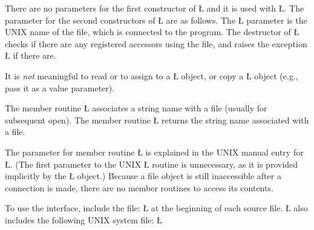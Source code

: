 \documentclass[openright,twoside]{report}
\begin{document}
There are no parameters for the first constructor of \LGinlinetrue\LGbegin\lgrinde\L{}\endlgrinde\LGend{} and it is used with \LGinlinetrue\LGbegin\lgrinde\L{}\endlgrinde\LGend{}.
The parameter for the second constructors of \LGinlinetrue\LGbegin\lgrinde\L{}\endlgrinde\LGend{} are as follows.
The \LGinlinetrue\LGbegin\lgrinde\L{}\endlgrinde\LGend{} parameter is the UNIX name of the file, which is connected to the program.
The destructor of \LGinlinetrue\LGbegin\lgrinde\L{}\endlgrinde\LGend{} checks if there are any registered accessors using the file, and raises the exception \LGinlinetrue\LGbegin\lgrinde\L{}\endlgrinde\LGend{} if there are.

It is \emph{not} meaningful to read or to assign to a \LGinlinetrue\LGbegin\lgrinde\L{}\endlgrinde\LGend{} object, or copy a \LGinlinetrue\LGbegin\lgrinde\L{}\endlgrinde\LGend{} object (e.g., pass it as a value parameter).

The member routine \LGinlinetrue\LGbegin\lgrinde\L{}\endlgrinde\LGend{} associates a string name with a file (usually for subsequent open).
The member routine \LGinlinetrue\LGbegin\lgrinde\L{}\endlgrinde\LGend{} returns the string name associated with a file.

The parameter for member routine \LGinlinetrue\LGbegin\lgrinde\L{}\endlgrinde\LGend{} is explained in the UNIX manual entry for \LGinlinetrue\LGbegin\lgrinde\L{}\endlgrinde\LGend{}.
(The first parameter to the UNIX \LGinlinetrue\LGbegin\lgrinde\L{}\endlgrinde\LGend{} routine is unnecessary, as it is provided implicitly by the \LGinlinetrue\LGbegin\lgrinde\L{}\endlgrinde\LGend{} object.)
Because a file object is still inaccessible after a connection is made, there are no member routines to access its contents.

To use the interface, include the file:
\LGinlinefalse\LGbegin\lgrinde
\L{}
\endlgrinde\LGend
{}%
at the beginning of each source file.
\LGinlinetrue\LGbegin\lgrinde\L{}\endlgrinde\LGend{} also includes the following UNIX system file: \LGinlinetrue\LGbegin\lgrinde\L{}\endlgrinde\LGend{}%
\end{document}

